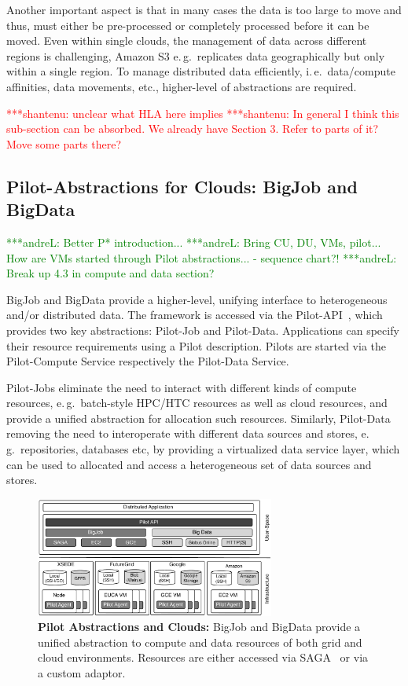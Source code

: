 \documentclass[times]{cpeauth}
\newcommand{\jhanote}[1]{ {\textcolor{red} { ***shantenu: #1 }}}
\newcommand{\alnote}[1]{ {\textcolor{green} { ***andreL: #1 }}}
\newcommand{\alnote}[1]{}
\newcommand{\jhanote}[1]{}
\newcommand{\pilot}{Pilot\xspace}
\newcommand{\pilots}{Pilots\xspace}
\newcommand{\pilotjob}{Pilot-Job\xspace}
\newcommand{\pilotjobs}{Pilot-Jobs\xspace}
\newcommand{\pilotdata}{Pilot-Data\xspace}
\newcommand{\pilotdataservice}{Pilot-Data Service\xspace}
\newcommand{\pilotcomputeservice}{Pilot-Compute Service\xspace}
\begin{document}
Another important aspect is that in many cases the data is too large
to move and thus, must either be pre-processed or completely processed
before it can be moved. Even within single clouds, the management of
data across different regions is challenging, Amazon S3
e.\,g.\ replicates data geographically but only within a single
region. To manage distributed data efficiently, i.\,e.\ data/compute
affinities, data movements, etc., higher-level of abstractions are
required. 

\jhanote{unclear what HLA here implies} \jhanote{In general I think
  this sub-section can be absorbed. We already have Section 3. Refer
  to parts of it? Move some parts there?}

\subsection{Pilot-Abstractions for Clouds: BigJob and BigData}

\alnote{Better P* introduction...}
\alnote{Bring CU, DU, VMs, pilot... How are VMs started through Pilot 
abstractions... - sequence chart?!}
\alnote{Break up 4.3 in compute and data section?}

BigJob and BigData provide a higher-level, unifying interface to heterogeneous
and/or distributed data. The framework is accessed via the
Pilot-API~\cite{pilot_api}, which provides two key abstractions: \pilotjob and
\pilotdata. Applications can specify their resource requirements using a
\pilot description. \pilots are started via the \pilotcomputeservice
respectively the \pilotdataservice.

\pilotjobs eliminate the need to interact with different kinds of compute 
resources, e.\,g.\ batch-style HPC/HTC resources as well as cloud resources, 
and provide a unified abstraction for allocation such resources. Similarly, 
\pilotdata removing the need to interoperate with different data sources and 
stores, e.\,g.\ repositories, databases etc, by providing a virtualized data 
service layer, which can be used to allocated and access a heterogeneous set 
of data sources and stores.

\begin{figure}[t]
	\centering
		\includegraphics[width=0.7\textwidth]{figures/cloud_pilot_job.pdf}
	\caption{\textbf{Pilot Abstractions and Clouds:} BigJob and BigData 
	provide a unified abstraction to compute and data resources of both grid 
	and cloud environments. Resources are either accessed via 
	SAGA~\cite{ogf-gfd-90,saga-bliss-pd} or via a custom adaptor.}
	\label{fig:figures_cloud_pilot_job}
\end{figure}
\end{document}
